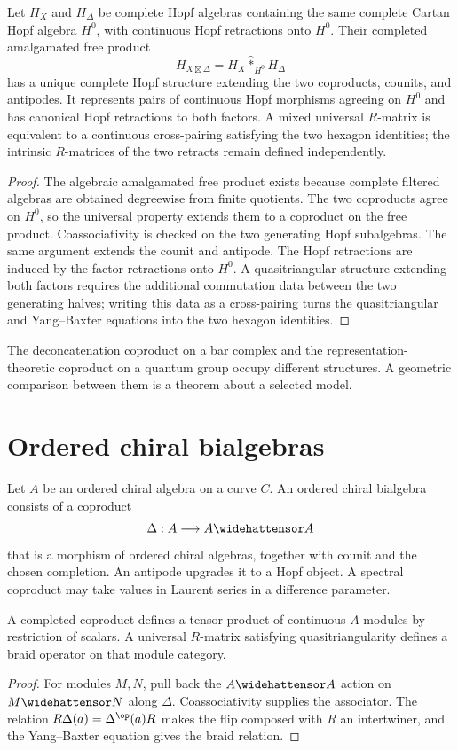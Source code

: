 \begin{theorem}
Let $H_X$ and $H_\Delta$ be complete Hopf algebras containing the same complete Cartan Hopf algebra $H^0$, with continuous Hopf retractions onto $H^0$.  Their completed amalgamated free product
\[
 H_{X\boxtimes\Delta}
 =H_X\widehat *_{H^0}H_\Delta
\]
has a unique complete Hopf structure extending the two coproducts, counits, and antipodes.  It represents pairs of continuous Hopf morphisms agreeing on $H^0$ and has canonical Hopf retractions to both factors.  A mixed universal $R$-matrix is equivalent to a continuous cross-pairing satisfying the two hexagon identities; the intrinsic $R$-matrices of the two retracts remain defined independently.
\end{theorem}
\begin{proof}
The algebraic amalgamated free product exists because complete filtered algebras are obtained degreewise from finite quotients.  The two coproducts agree on $H^0$, so the universal property extends them to a coproduct on the free product.  Coassociativity is checked on the two generating Hopf subalgebras.  The same argument extends the counit and antipode.  The Hopf retractions are induced by the factor retractions onto $H^0$.  A quasitriangular structure extending both factors requires the additional commutation data between the two generating halves; writing this data as a cross-pairing turns the quasitriangular and Yang--Baxter equations into the two hexagon identities.
\end{proof}

The deconcatenation coproduct on a bar complex and the representation-theoretic coproduct on a quantum group occupy different structures. A geometric comparison between them is a theorem about a selected model.

\chapter{Ordered chiral bialgebras}
Let $A$ be an ordered chiral algebra on a curve $C$. An ordered chiral bialgebra consists of a coproduct
\[
 \Delta:A\longrightarrow A\widehattensor A
\]
that is a morphism of ordered chiral algebras, together with counit and the chosen completion. An antipode upgrades it to a Hopf object. A spectral coproduct may take values in Laurent series in a difference parameter.

\begin{theorem}
A completed coproduct defines a tensor product of continuous $A$-modules by restriction of scalars. A universal $R$-matrix satisfying quasitriangularity defines a braid operator on that module category.
\end{theorem}
\begin{proof}
For modules $M,N$, pull back the $A\widehattensor A$ action on $M\widehattensor N$ along $\Delta$. Coassociativity supplies the associator. The relation $R\Delta(a)=\Delta^{\op}(a)R$ makes the flip composed with $R$ an intertwiner, and the Yang--Baxter equation gives the braid relation.
\end{proof}

